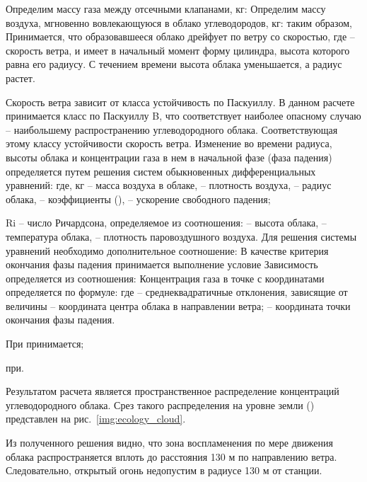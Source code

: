 \pagebreak

Определим массу газа между отсечными клапанами, кг:
Определим массу воздуха, мгновенно вовлекающуюся в облако углеводородов, кг:
таким образом,
Принимается, что образовавшееся облако дрейфует по ветру со скоростью, где – скорость ветра, и имеет в начальный момент форму цилиндра, высота которого равна его радиусу. С течением времени высота облака уменьшается, а радиус растет.

Скорость ветра зависит от класса устойчивость по Паскуиллу. В данном расчете принимается класс по Паскуиллу B, что соответствует наиболее опасному случаю – наибольшему распространению углеводородного облака. Соответствующая этому классу устойчивости скорость ветра.
Изменение во времени радиуса, высоты облака и концентрации газа в нем в начальной фазе (фаза падения) определяется путем решения систем обыкновенных дифференциальных уравнений:
где, кг – масса воздуха в облаке, – плотность воздуха, – радиус облака, – коэффициенты (), – ускорение свободного падения;

Ri – число Ричардсона, определяемое из соотношения:
– высота облака, – температура облака, – плотность паровоздушного воздуха.
Для решения системы уравнений необходимо дополнительное соотношение:
В качестве критерия окончания фазы падения принимается выполнение условие
Зависимость определяется из соотношения:
Концентрация газа в точке с координатами  определяется по формуле:
где – среднеквадратичные отклонения, зависящие от величины – координата центра облака в направлении ветра; – координата точки окончания фазы падения.

При принимается;

при.

Результатом расчета является пространственное распределение концентраций углеводородного облака. Срез такого
распределения на уровне земли () представлен на рис.~\ref{img:ecology_cloud}.

Из полученного решения видно, что зона воспламенения по мере движения облака распространяется вплоть до расстояния 130 м по направлению ветра. Следовательно, открытый огонь недопустим в радиусе 130 м от станции.
